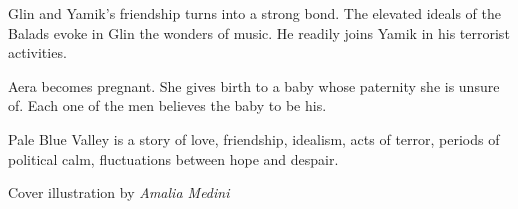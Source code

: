 \documentclass[
  spinewidth=0.8325in,
  coverwidth=6in,
  coverheight=9in,
  marklength=0.125in,
  bleedwidth=0.125in,
  12pt
]{bookcover}
\begin{document}
\begin{bookcover}
{{Glin and Yamik's friendship turns into a strong bond. The elevated
ideals of the Balads evoke in Glin the wonders of music. He readily
joins Yamik in his terrorist activities.

Aera becomes pregnant. She gives birth to a baby whose paternity she
is unsure of. Each one of the men believes the baby to be his.

Pale Blue Valley is a story of love, friendship, idealism, acts of
terror, periods of political calm, fluctuations between hope and despair.

\begin{center}
  \textsf{Cover illustration by} \textit{Amalia Medini}
\end{center}
    }

}


\end{bookcover}
\end{document}
